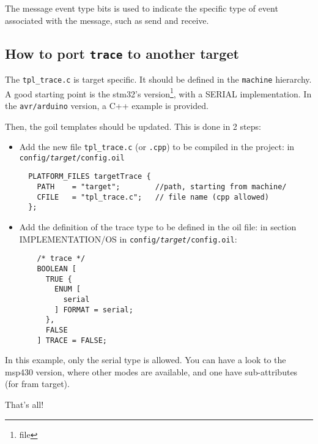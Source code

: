 The message event type bits is used to indicate the specific type of event associated with the message, such as send and receive.

\subsection{How to port \texttt{trace} to another target}

The \texttt{tpl\_trace.c} is target specific. It should be defined in the \lstinline{machine} hierarchy. A good starting point is the stm32's version\footnote{file }, with a SERIAL implementation. In the \texttt{avr/arduino} version, a C++ example is provided.

Then, the goil templates should be updated. This is done in 2 steps:

\begin{itemize}
	\item Add the new file \texttt{tpl\_trace.c} (or \texttt{.cpp}) to be compiled in the project: in \texttt{config/\textit{target}/config.oil} \\

\lstset{language=OIL}
\begin{lstlisting}
  PLATFORM_FILES targetTrace {
    PATH    = "target";        //path, starting from machine/
    CFILE   = "tpl_trace.c";   // file name (cpp allowed)
  };
\end{lstlisting}

	\item Add the definition of the trace type to be defined in the oil file: in section IMPLEMENTATION/OS in \texttt{config/\textit{target}/config.oil}:
\begin{lstlisting}
    /* trace */
    BOOLEAN [
      TRUE {
        ENUM [
          serial
        ] FORMAT = serial;
      },
      FALSE
    ] TRACE = FALSE;
\end{lstlisting}
\end{itemize}

In this example, only the serial type is allowed. You can have a look to the msp430 version, where other modes are available, and one have sub-attributes (for fram target).

That's all!
